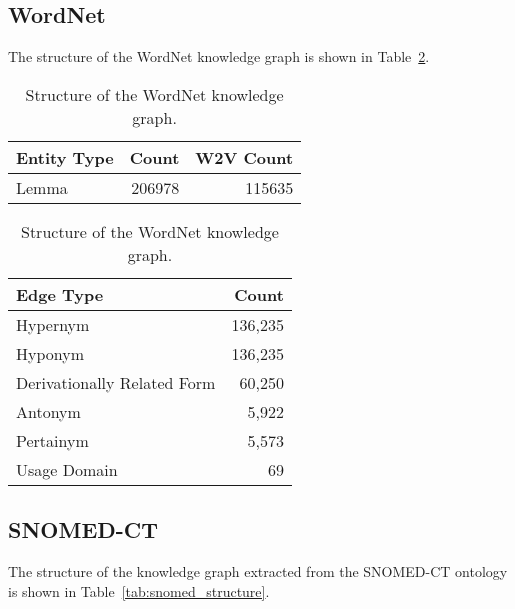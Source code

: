 \documentclass[11pt, a4paper]{article}
\begin{document}
\clearpage
\subsection{WordNet}
\label{sec:wordnet_structure}
The structure of the WordNet knowledge graph \cite{miller1995wordnet} is shown in Table~\ref{tab:wordnet_structure}.

\begin{table}[ht]
    \centering
    \begin{tabular}{l r r}
        \toprule
        \bf{Entity Type} & \bf{Count} & \bf{W2V Count} \\
        \midrule
        Lemma & 206978 & 115635 \\
        \bottomrule
    \end{tabular}
    \vspace{8pt}
    
    \begin{tabular}{l r}
        \toprule
        \bf{Edge Type} & \bf{Count}\\
        \midrule
        Hypernym & 136,235 \\
        Hyponym & 136,235 \\
        Derivationally Related Form & 60,250 \\
        Antonym & 5,922 \\
        Pertainym & 5,573 \\
        Usage Domain & 69 \\
        \bottomrule
    \end{tabular}
    \caption{Structure of the WordNet knowledge graph.}
    \label{tab:wordnet_structure}
\end{table}


\subsection{SNOMED-CT}
\label{sec:snomed_structure}
The structure of the knowledge graph extracted from the SNOMED-CT ontology is shown in Table~\ref{tab:snomed_structure}.
\end{document}
